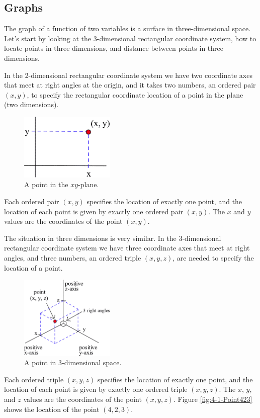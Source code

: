 \subsection{Graphs}
The graph of a function of two variables is a surface in three-dimensional space. Let's start by looking at the 3-dimensional rectangular coordinate system, how to locate points in three dimensions, and distance between points in three dimensions.

In the 2-dimensional rectangular coordinate system we have two coordinate axes that meet at right angles at the origin, and it takes two numbers, an ordered pair $(x,y)$, to specify the rectangular coordinate location of a point in the plane (two dimensions).

\begin{figure}[!ht]
  \centering
    \includegraphics[width=0.4\textwidth]{img/chap4/image002.png}
    \caption{A point in the $xy$-plane.}
    \label{fig:4-1-2dPoint}
\end{figure}
Each ordered pair $(x,y)$ specifies the location of exactly one point, and the location of each point is given by exactly one ordered pair $(x,y)$. The $x$ and $y$ values are the coordinates of the point $(x,y)$.

The situation in three dimensions is very similar. In the 3-dimensional rectangular coordinate system we have three coordinate axes that meet at right angles, and three numbers, an ordered triple $(x,y,z)$, are needed to specify the location of a point.

\begin{figure}[!ht]
  \centering
    \includegraphics[width=0.4\textwidth]{img/chap4/image003.png}
    \caption{A point in 3-dimensional space.}
    \label{fig:4-1-3dPoint}
\end{figure}
Each ordered triple $(x,y,z)$ specifies the location of exactly one point, and the location of each point is given by exactly one ordered triple $(x,y,z)$. The $x$, $y$, and $z$ values are the coordinates of the point $(x,y,z)$. Figure \ref{fig:4-1-Point423} shows the location of the point $(4, 2, 3)$.

